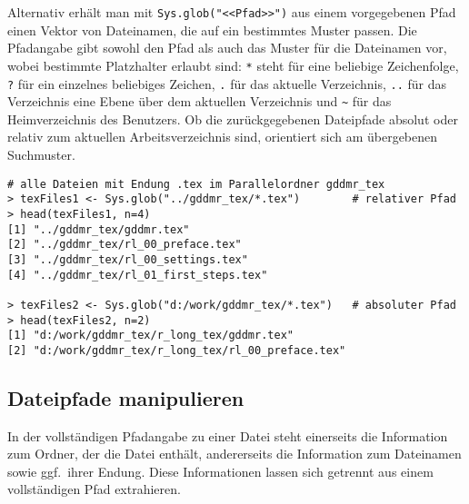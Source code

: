 Alternativ erhält man mit \lstinline!Sys.glob("<<Pfad>>")! aus einem vorgegebenen Pfad einen Vektor von Dateinamen, die auf ein bestimmtes Muster passen. Die Pfadangabe gibt sowohl den Pfad als auch das Muster für die Dateinamen vor, wobei bestimmte Platzhalter erlaubt sind: \lstinline!*! steht für eine beliebige Zeichenfolge, \lstinline!?! für ein einzelnes beliebiges Zeichen, \lstinline!.! für das aktuelle Verzeichnis, \lstinline!..! für das Verzeichnis eine Ebene über dem aktuellen Verzeichnis und \lstinline!~! für das Heimverzeichnis des Benutzers. Ob die zurückgegebenen Dateipfade absolut oder relativ zum aktuellen Arbeitsverzeichnis sind, orientiert sich am übergebenen Suchmuster.
\begin{lstlisting}
# alle Dateien mit Endung .tex im Parallelordner gddmr_tex
> texFiles1 <- Sys.glob("../gddmr_tex/*.tex")        # relativer Pfad
> head(texFiles1, n=4)
[1] "../gddmr_tex/gddmr.tex"
[2] "../gddmr_tex/rl_00_preface.tex"
[3] "../gddmr_tex/rl_00_settings.tex"
[4] "../gddmr_tex/rl_01_first_steps.tex"

> texFiles2 <- Sys.glob("d:/work/gddmr_tex/*.tex")   # absoluter Pfad
> head(texFiles2, n=2)
[1] "d:/work/gddmr_tex/r_long_tex/gddmr.tex"
[2] "d:/work/gddmr_tex/r_long_tex/rl_00_preface.tex"
\end{lstlisting}

\subsection{Dateipfade manipulieren}
\label{sec:filesName}

In der vollständigen Pfadangabe zu einer Datei steht einerseits die Information zum Ordner, der die Datei enthält, andererseits die Information zum Dateinamen sowie ggf.\ ihrer Endung. Diese Informationen lassen sich getrennt aus einem vollständigen Pfad extrahieren.

